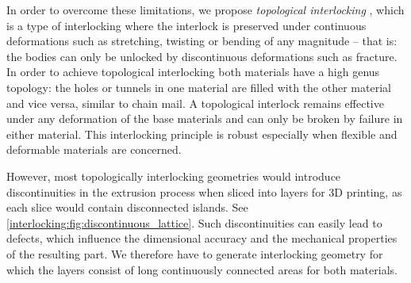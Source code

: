 In order to overcome these limitations, we propose \emph{topological interlocking}
{, which is a type of interlocking where the interlock is preserved under continuous deformations such as stretching, twisting or bending of any magnitude 
-- that is: the bodies can only be unlocked by discontinuous deformations such as fracture.
In order to achieve topological interlocking both materials have a high genus topology:}
the holes or tunnels in one material are filled with the other material and vice versa,
similar to chain mail.
A topological interlock remains effective under any deformation of the base materials and can only be broken by failure in either material.
This interlocking principle is robust especially when flexible and deformable materials are concerned.


However, most topologically interlocking geometries would introduce discontinuities in the extrusion process when sliced into layers for 3D printing, as each slice would contain disconnected islands.
See \cref{interlocking:fig:discontinuous_lattice}.
Such discontinuities can easily lead to defects, which influence the dimensional accuracy and the mechanical properties of the resulting part.
We therefore have to generate interlocking geometry for which the layers consist of long continuously connected areas for both materials.

